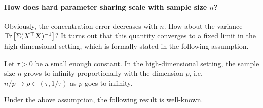 \paragraph{How does hard parameter sharing scale with sample size $n$?}
Obviously, the concentration error decreases with $n$.
How about the variance $\operatorname{Tr}\left[\Sigma (X^{\top} X)^{-1}\right]$?
It turns out that this quantity converges to a fixed limit in the high-dimensional setting, which is formally stated in the following assumption.

\begin{assumption}\label{assume_rm}
	Let $\tau > 0$ be a small enough constant.
	In the high-dimensional setting,
  the sample size $n$ grows to infinity proportionally with the dimension $p$, i.e. $n / p \rightarrow \rho \in (\tau, 1/\tau)$ as $p$ goes to infinity.
\end{assumption}
Under the above assumption, the following result is well-known.

